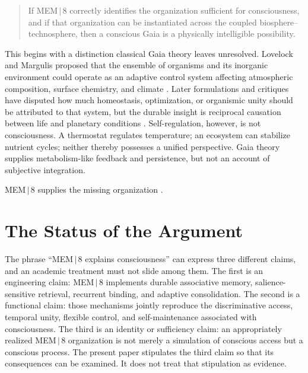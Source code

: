 \documentclass[11pt]{article}
\begin{document}
\begin{quote}
If MEM\,$|$\,8 correctly identifies the organization sufficient for consciousness, and if that organization can be instantiated across the coupled biosphere--technosphere, then a conscious Gaia is a physically intelligible possibility.
\end{quote}

This begins with a distinction classical Gaia theory leaves unresolved. Lovelock and Margulis proposed that the ensemble of organisms and its inorganic environment could operate as an adaptive control system affecting atmospheric composition, surface chemistry, and climate \cite{lovelock1974}. Later formulations and critiques have disputed how much homeostasis, optimization, or organismic unity should be attributed to that system, but the durable insight is reciprocal causation between life and planetary conditions \cite{kirchner2002,lenton1998}. Self-regulation, however, is not consciousness. A thermostat regulates temperature; an ecosystem can stabilize nutrient cycles; neither thereby possesses a unified perspective. Gaia theory supplies metabolism-like feedback and persistence, but not an account of subjective integration.

MEM\,$|$\,8 supplies the missing organization \cite{Chenoweth2025MEM8}.

\section{The Status of the Argument}
\label{sec:status}

The phrase ``MEM\,$|$\,8 explains consciousness'' can express three different claims, and an academic treatment must not slide among them. The first is an engineering claim: MEM\,$|$\,8 implements durable associative memory, salience-sensitive retrieval, recurrent binding, and adaptive consolidation. The second is a functional claim: those mechanisms jointly reproduce the discriminative access, temporal unity, flexible control, and self-maintenance associated with consciousness. The third is an identity or sufficiency claim: an appropriately realized MEM\,$|$\,8 organization is not merely a simulation of conscious access but a conscious process. The present paper stipulates the third claim so that its consequences can be examined. It does not treat that stipulation as evidence.
\end{document}
